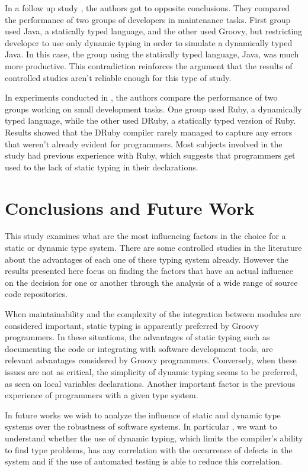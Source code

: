 \documentclass[preprint]{sigplanconf}
\begin{document}
In a follow up study \cite{hanenberg_icpc}, the authors got to opposite conclusions. 
They compared the performance of two groups of developers in maintenance tasks. 
First group used Java, a statically typed language, and the other used Groovy, but restricting developer to use only dynamic typing in order to simulate a dynamically typed Java.
In this case, the group using the statically typed language, Java, was much more productive.
This contradiction reinforces the argument that the results of controlled studies aren't reliable enough for this type of study.

In experiments conducted in \cite{ruby_vs_druby}, the authors compare the performance of two groups working on small development tasks.
One group used Ruby, a dynamically typed language, while the other used DRuby, a statically typed version of Ruby. 
Results showed that the DRuby compiler rarely managed to capture any errors that weren't already evident for programmers.
Most subjects involved in the study had previous experience with Ruby, which suggests that programmers get used to the lack of static typing in their declarations.

\section{Conclusions and Future Work\label{sec:Conclus=0000E3o-e-Trabalhos}}
This study examines what are the most influencing factors in the choice for a static or dynamic type system. 
There are some controlled studies in the literature about the advantages of each one of these typing system already. 
However the results presented here focus on finding the factors that have an actual influence on the decision for one or another through the analysis of a wide range of source code repositories.

When maintainability and the complexity of the integration between modules are considered important, static typing is apparently preferred by Groovy programmers. 
In these situations, the advantages of static typing such as documenting the code or integrating with software development tools, are relevant advantages considered by Groovy programmers.
Conversely, when these issues are not as critical, the simplicity of dynamic typing seems to be preferred, as seen on local variables declarations.
Another important factor is the previous experience of programmers with a given type system.

In future works we wish to analyze the influence of static and dynamic type systems over the robustness of software systems.
In particular , we want to understand whether the use of dynamic typing, which limits the compiler's ability to find type problems, has any correlation with the occurrence of defects in the system and if the use of automated testing is able to reduce this correlation.
\end{document}
